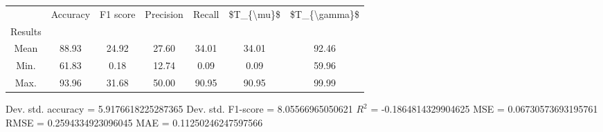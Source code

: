 \begin{tabular}{|c|c|c|c|c|c|c|}
\toprule
{} &  Accuracy &  F1 score &  Precision &  Recall &  \$T\_\{\textbackslash mu\}\$ &  \$T\_\{\textbackslash gamma\}\$ \\
Results &           &           &            &         &            &               \\
\hline
Mean    &     88.93 &     24.92 &      27.60 &   34.01 &      34.01 &         92.46 \\
Min.    &     61.83 &      0.18 &      12.74 &    0.09 &       0.09 &         59.96 \\
Max.    &     93.96 &     31.68 &      50.00 &   90.95 &      90.95 &         99.99 \\
\bottomrule
\end{tabular}

 Dev. std. accuracy = 5.9176618225287365
 Dev. std. F1-score = 8.05566965050621
 $R^2$ = -0.1864814329904625
 MSE = 0.06730573693195761
 RMSE = 0.2594334923096045
 MAE = 0.11250246247597566